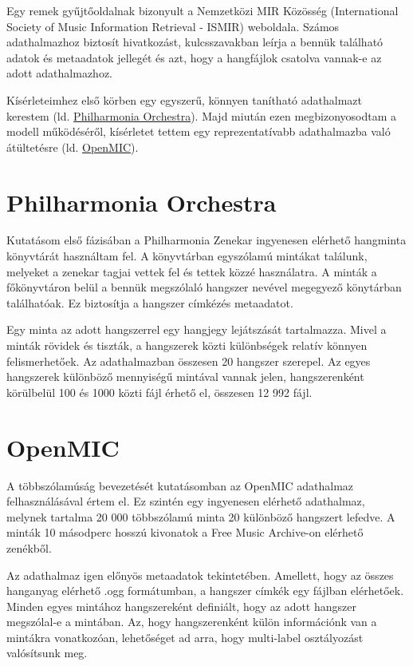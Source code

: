 Egy remek gyűjtőoldalnak bizonyult a Nemzetközi MIR Közösség (International Society of Music Information Retrieval - ISMIR) weboldala. Számos adathalmazhoz biztosít hivatkozást, kulcsszavakban leírja a bennük található adatok és metaadatok jellegét és azt, hogy a hangfájlok csatolva vannak-e az adott adathalmazhoz. \cite{ismirdataset}

Kísérleteimhez első körben egy egyszerű, könnyen tanítható adathalmazt kerestem (ld. \hyperref[sec:Philharmonia]{Philharmonia Orchestra}). Majd miután ezen megbizonyosodtam a modell működéséről, kísérletet tettem egy reprezentatívabb adathalmazba való átültetésre (ld. \hyperref[sec:OpenMIC]{OpenMIC}).

\section{Philharmonia Orchestra}
\label{sec:Philharmonia}

Kutatásom első fázisában a Philharmonia Zenekar ingyenesen elérhető hangminta könyvtárát használtam fel. A könyvtárban egyszólamú mintákat találunk, melyeket a zenekar tagjai vettek fel és tettek közzé használatra. A minták a főkönyvtáron belül a bennük megszólaló hangszer nevével megegyező könytárban találhatóak. Ez biztosítja a hangszer címkézés metaadatot.

Egy minta az adott hangszerrel egy hangjegy lejátszását tartalmazza. Mivel a minták rövidek és tiszták, a hangszerek közti különbségek relatív könnyen felismerhetőek. Az adathalmazban összesen 20 hangszer szerepel. Az egyes hangszerek különböző mennyiségű mintával vannak jelen, hangszerenként körülbelül 100 és 1000 közti fájl érhető el, összesen 12 992 fájl.

\section{OpenMIC}
\label{sec:OpenMIC}

A többszólamúság bevezetését kutatásomban az OpenMIC \cite{humphrey2018openmic} adathalmaz felhasználásával értem el. Ez szintén egy ingyenesen elérhető adathalmaz, melynek tartalma 20 000 többszólamú minta 20 különböző hangszert lefedve. A minták 10 másodperc hosszú kivonatok a Free Music Archive-on \cite{fma2016} elérhető zenékből. \cite{humphrey2018openmic}

Az adathalmaz igen előnyös metaadatok tekintetében. Amellett, hogy az összes hanganyag elérhető .ogg formátumban, a hangszer címkék egy fájlban elérhetőek. Minden egyes mintához hangszereként definiált, hogy az adott hangszer megszólal-e a mintában. Az, hogy hangszerenként külön információnk van a mintákra vonatkozóan, lehetőséget ad arra, hogy multi-label osztályozást valósítsunk meg. \cite{humphrey2018openmic}

